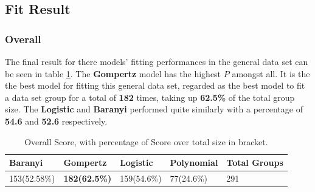 \documentclass[11pt]{article}
\begin{document}
\subsection{Fit Result}
\subsubsection{Overall}
The final result for there models' fitting performances in the general data set can be seen in table \ref{tab: overallS}. The \textbf{Gompertz} model has the highest $P$ amongst all. It is the the best model for fitting this general data set, regarded as the best model to fit a data set group for a total of \textbf{182} times, taking up \textbf{62.5\%} of the total group size. The \textbf{Logistic} and \textbf{Baranyi} performed quite similarly with a percentage of \textbf{54.6} and \textbf{52.6} respectively.\\
\FloatBarrier
\begin{table}[!htbp]
\begin{tabularx}{\linewidth}{X X X X X}
\toprule Baranyi& \textbf{Gompertz} & Logistic & Polynomial & Total Groups\\
\midrule
 153(52.58\%) & \textbf{182(62.5\%)} & 159(54.6\%) & 77(24.6\%) & 291 \\
\bottomrule
\end{tabularx}
\caption{Overall Score, with percentage of Score over total size in bracket.}
\label{tab: overallS}
\end{table}          
\FloatBarrier
\end{document}

